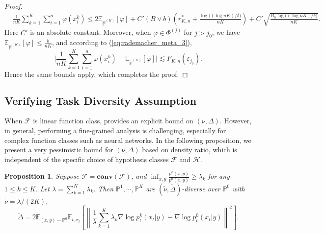 \documentclass{article}
\numberwithin{equation}{section}
\def\eqref#1{equation~\ref{#1}}
\newcommand{\E}{\mathbb{E}}
\newtheorem{prop}[thm]{Proposition}
\theoremstyle{definition}
\renewcommand{\P}{\mathbb{P}}
\renewcommand{\eqref}[1]{(\ref{#1})}
\begin{document}
\begin{proof}
\begin{align}
        &\frac{1}{nK}\sum_{k=1}^K\sum_{i=1}^n\varphi(x_i^k)\leq 2\E_{\widehat{\P}^{(K)}}[\varphi]+C'(B\vee b)\left(r_{K,n}^* + \frac{\log\big((\log nK)/\delta\big)}{nK}\right)+C'\sqrt{\frac{B_0\log\big((\log nK)/\delta\big)}{nK}}.
    \end{align}
    Here $C'$ is an absolute constant. Moreover, when $\varphi\in\Phi^{(j)}$ for $j>j_0$, we have $\E_{\widehat{\P}^{(K)}}[\varphi]\leq \frac{b}{nK}$, and according to \eqref{eq:rademacher_meta_3},
    \begin{equation}
        \Big|\frac{1}{nK}\sum_{k=1}^K\sum_{i=1}^n\varphi(x_i^k)-\E_{\widehat{\P}^{(K)}}[\varphi]\Big|\lesssim F_{K,n}(\varepsilon_{j_0}).
    \end{equation}
    Hence the same bounds apply, which completes the proof.
\end{proof}

\subsection{Verifying Task Diversity Assumption}\label{app:subsec:verify_diversity}

When $\mathcal{F}$ is linear function class, \citet{tripuraneni2020theory} provides an explicit bound on $(\nu,\Delta)$.
However, in general, performing a fine-grained analysis is challenging, especially for complex function classes such as neural networks.
In the following proposition, we present a very pessimistic bound for $(\nu,\Delta)$ based on density ratio, which is independent of the specific choice of hypothesis classes $\mathcal{F}$ and $\mathcal{H}$.
\begin{prop}
    Suppose $\mathcal{F}=\textbf{conv}(\mathcal{F})$,
    and $\inf_{x,y}\frac{p^k(x,y)}{p^0(x,y)}\geq \lambda_k$ for any $1\leq k\leq K$.
    Let $\lambda=\sum_{k=1}^K\lambda_k$.
    Then $\P^1,\cdots,\P^K$ are $(\widetilde{\nu},\widetilde{\Delta})$-diverse over $\P^0$ with $\widetilde{\nu}=\lambda/(2K)$,
    \begin{equation}
        \widetilde{\Delta}=2\E_{(x,y)\sim\P^0}\E_{t,x_t}\left[\left\|\frac{1}{\lambda}\sum_{k=1}^K\lambda_k\nabla\log p_t^k(x_t|y)-\nabla\log p_t^0(x_t|y)\right\|^2\right].
    \end{equation}
\end{prop}
\end{document}
